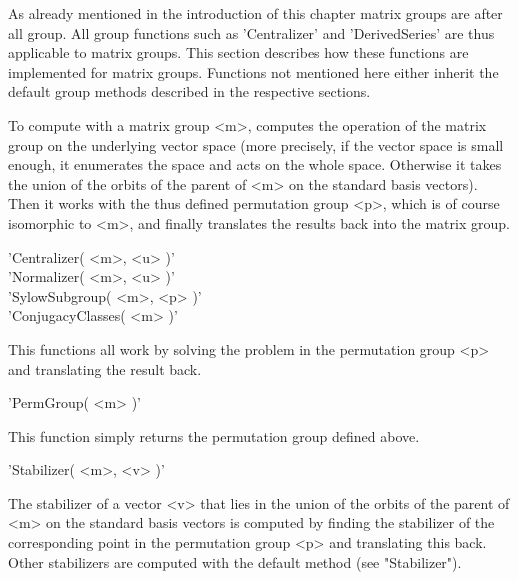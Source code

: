 
As already mentioned  in  the introduction of this  chapter matrix groups
are  after  all group.  All group functions  such  as  'Centralizer'  and
'DerivedSeries'  are  thus  applicable  to  matrix groups.  This  section
describes  how  these  functions  are  implemented  for   matrix  groups.
Functions not mentioned here  either inherit  the  default  group methods
described in the respective sections.

To compute with a  matrix group <m>, {\GAP} computes the operation of the
matrix  group on the underlying vector space (more precisely, if the vector
space is small enough, it enumerates the space and acts on the whole space.
Otherwise it takes the union of
the orbits of the parent of <m> on the standard basis vectors).   Then it
works  with  the thus defined permutation  group <p>, which is of  course
isomorphic to  <m>, and  finally  translates the results  back  into  the
matrix group.

\vspace{5mm}
'Centralizer( <m>, <u> )' \\
'Normalizer( <m>, <u> )' \\
'SylowSubgroup( <m>, <p> )' \\
'ConjugacyClasses( <m> )'

This functions  all work by solving the  problem in the permutation group
<p> and translating the result back.

\vspace{5mm}
'PermGroup( <m> )'

This function simply returns the permutation group defined above.

\vspace{5mm}
'Stabilizer( <m>, <v> )'

The  stabilizer of  a vector <v> that lies in the  union of the orbits of
the parent of <m> on  the standard basis  vectors  is computed by finding
the stabilizer  of the corresponding point in  the permutation  group <p>
and  translating  this back.   Other stabilizers are  computed  with  the
default method (see "Stabilizer").

